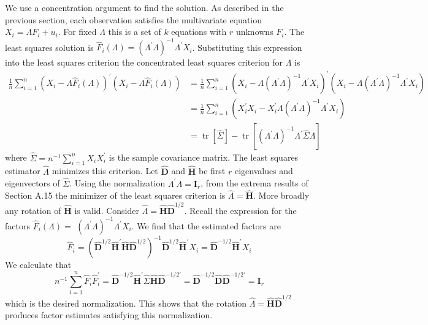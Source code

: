 \documentclass[10pt]{article}
\begin{document}
We use a concentration argument to find the solution. As described in the previous section, each observation satisfies the multivariate equation $X_{i}=\Lambda F_{i}+u_{i}$. For fixed $\Lambda$ this is a set of $k$ equations with $r$ unknowns $F_{i}$. The least squares solution is $\widehat{F}_{i}(\Lambda)=\left(\Lambda^{\prime} \Lambda\right)^{-1} \Lambda^{\prime} X_{i}$. Substituting this expression into the least squares criterion the concentrated least squares criterion for $\Lambda$ is
$$
\begin{aligned}
\frac{1}{n} \sum_{i=1}^{n}\left(X_{i}-\Lambda \widehat{F}_{i}(\Lambda)\right)^{\prime}\left(X_{i}-\Lambda \widehat{F}_{i}(\Lambda)\right) &=\frac{1}{n} \sum_{i=1}^{n}\left(X_{i}-\Lambda\left(\Lambda^{\prime} \Lambda\right)^{-1} \Lambda^{\prime} X_{i}\right)^{\prime}\left(X_{i}-\Lambda\left(\Lambda^{\prime} \Lambda\right)^{-1} \Lambda^{\prime} X_{i}\right) \\
&=\frac{1}{n} \sum_{i=1}^{n}\left(X_{i}^{\prime} X_{i}-X_{i}^{\prime} \Lambda\left(\Lambda^{\prime} \Lambda\right)^{-1} \Lambda^{\prime} X_{i}\right) \\
&=\operatorname{tr}[\widehat{\Sigma}]-\operatorname{tr}\left[\left(\Lambda^{\prime} \Lambda\right)^{-1} \Lambda^{\prime} \widehat{\Sigma} \Lambda\right]
\end{aligned}
$$
where $\widehat{\Sigma}=n^{-1} \sum_{i=1}^{n} X_{i} X_{i}^{\prime}$ is the sample covariance matrix. The least squares estimator $\widehat{\Lambda}$ minimizes this criterion. Let $\widehat{\boldsymbol{D}}$ and $\widehat{\boldsymbol{H}}$ be first $r$ eigenvalues and eigenvectors of $\widehat{\Sigma}$. Using the normalization $\Lambda^{\prime} \Lambda=\boldsymbol{I}_{r}$, from the extrema results of Section A.15 the minimizer of the least squares criterion is $\widehat{\Lambda}=\widehat{\boldsymbol{H}}$. More broadly any rotation of $\widehat{\boldsymbol{H}}$ is valid. Consider $\widehat{\Lambda}=\widehat{\boldsymbol{H}} \widehat{\boldsymbol{D}}^{1 / 2}$. Recall the expression for the factors $\widehat{F}_{i}(\Lambda)=$ $\left(\Lambda^{\prime} \Lambda\right)^{-1} \Lambda^{\prime} X_{i}$. We find that the estimated factors are
$$
\widehat{F}_{i}=\left(\widehat{\boldsymbol{D}}^{1 / 2} \widehat{\boldsymbol{H}}^{\prime} \widehat{\boldsymbol{H}} \widehat{\boldsymbol{D}}^{1 / 2}\right)^{-1} \widehat{\boldsymbol{D}}^{1 / 2} \widehat{\boldsymbol{H}}^{\prime} X_{i}=\widehat{\boldsymbol{D}}^{-1 / 2} \widehat{\boldsymbol{H}}^{\prime} X_{i}
$$
We calculate that
$$
n^{-1} \sum_{i=1}^{n} \widehat{F}_{i} \widehat{F}_{i}^{\prime}=\widehat{\boldsymbol{D}}^{-1 / 2} \widehat{\boldsymbol{H}}^{\prime} \widehat{\Sigma} \widehat{\boldsymbol{H}} \widehat{\boldsymbol{D}}^{-1 / 2 \prime}=\widehat{\boldsymbol{D}}^{-1 / 2} \widehat{\boldsymbol{D}} \widehat{\boldsymbol{D}}^{-1 / 2 \prime}=\boldsymbol{I}_{r}
$$
which is the desired normalization. This shows that the rotation $\widehat{\Lambda}=\widehat{\boldsymbol{H}} \widehat{\boldsymbol{D}}^{1 / 2}$ produces factor estimates satisfying this normalization.
\end{document}
